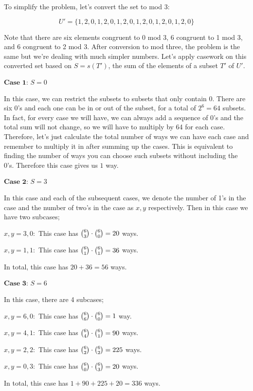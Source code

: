 \begin{enumerate}
 To simplify the problem, let’s convert the set to mod 3:

 
 \[U' = \{1,2,0,1,2,0,1,2,0,1,2,0,1,2,0,1,2,0\}\]

 Note that there are six elements congruent to 0 mod 3, 6 congruent to 1 mod 3, and 6 congruent to 2 mod 3. After conversion to mod three, the problem is the same but we’re dealing with much simpler numbers. Let’s apply casework on this converted set based on $S = s(T')$, the sum of the elements of a subset $T'$ of $U'$.

 $\textbf{Case 1: }S=0$

 In this case, we can restrict the subsets to subsets that only contain 0. There are six 0’s and each one can be in or out of the subset, for a total of $2^{6} = 64$ subsets. In fact, for every case we will have, we can always add a sequence of 0’s and the total sum will not change, so we will have to multiply by 64 for each case. Therefore, let’s just calculate the total number of ways we can have each case and remember to multiply it in after summing up the cases. This is equivalent to finding the number of ways you can choose such subsets without including the 0's. Therefore this case gives us $\boxed{1}$ way.

 $\textbf{Case 2: }S= 3$

 In this case and each of the subsequent cases, we denote the number of 1’s in the case and the number of two’s in the case as $x, y$ respectively. Then in this case we have two subcases;

 $x, y = 3,0:$ This case has $\tbinom{6}{3} \cdot \tbinom{6}{0} = 20$ ways.

 $x, y = 1,1:$ This case has $\tbinom{6}{1} \cdot \tbinom{6}{1} = 36$ ways.

 In total, this case has $20+36=\boxed{56}$ ways.

 $\textbf{Case 3: }S=6$

 In this case, there are 4 subcases;

 $x, y = 6,0:$ This case has $\tbinom{6}{6} \cdot \tbinom{6}{0} = 1$ way.

 $x, y = 4,1:$ This case has $\tbinom{6}{4} \cdot \tbinom{6}{1} = 90$ ways.

 $x, y = 2,2:$ This case has $\tbinom{6}{2} \cdot \tbinom{6}{2} = 225$ ways.

 $x, y = 0,3:$ This case has $\tbinom{6}{0} \cdot \tbinom{6}{3} = 20$ ways.

 In total, this case has $1+90+225+20=\boxed{336}$ ways.


\end{enumerate}
